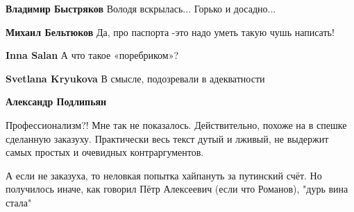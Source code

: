\begin{itemize}
\begin{itemize}
\textbf{Владимир Быстряков} Володя вскрылась... Горько и досадно...

 
\textbf{Михаил Бельтюков} Да, про паспорта -это надо уметь такую чушь написать!

 
\textbf{Inna Salan} А что такое «поребриком»?

 
\textbf{Svetlana Kryukova} В смысле, подозревали в адекватности

 
\textbf{Александр Подлипьян} 

Профессионализм?! Мне так не показалось. Действительно, похоже на в спешке
сделанную заказуху. Практически весь текст дутый и лживый, не выдержит самых
простых и очевидных контраргументов.

А если не заказуха, то неловкая попытка хайпануть за путинский счёт. Но
получилось иначе, как говорил Пётр Алексеевич (если что Романов), "дурь вина
стала"

\end{itemize}

\end{itemize}

